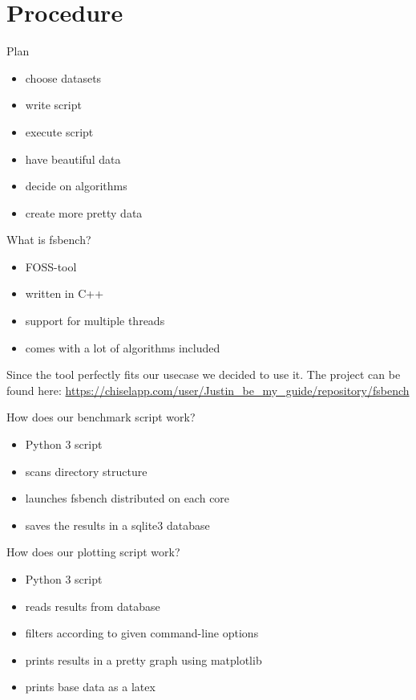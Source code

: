 \documentclass[10pt, compress]{beamer}
\begin{document}
\section{Procedure}
\begin{frame}{Plan}
    \begin{itemize}
        \item choose datasets
        \item write script
        \item execute script
        \item have beautiful data
        \item decide on algorithms
        \item create more pretty data
    \end{itemize}
\end{frame}
\begin{frame}{What is fsbench?}
    \begin{itemize}
        \item FOSS-tool
        \item written in C++
        \item support for multiple threads
        \item comes with a lot of algorithms included
    \end{itemize}
    \vspace{1em}
    Since the tool perfectly fits our usecase we decided to use it.
    The project can be found here:
    \url{https://chiselapp.com/user/Justin_be_my_guide/repository/fsbench}
\end{frame}
\begin{frame}{How does our benchmark script work?}
    \begin{itemize}
        \item Python 3 script
        \item scans directory structure
        \item launches fsbench distributed on each core
        \item saves the results in a sqlite3 database
    \end{itemize}
\end{frame}

\begin{frame}{How does our plotting script work?}
    \begin{itemize}
        \item Python 3 script
        \item reads results from database
        \item filters according to given command-line options
        \item prints results in a pretty graph using matplotlib
        \item prints base data as a latex
    \end{itemize}
\end{frame}
\end{document}
